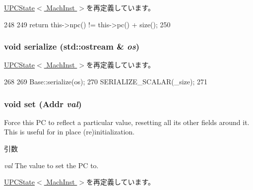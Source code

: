 \hyperlink{classGenericISA_1_1UPCState_ae3f0eb15a9382eefff6b00cf7999c2e3}{UPCState$<$ MachInst $>$}を再定義しています。


\begin{DoxyCode}
248         {
249             return this->npc() != this->pc() + size();
250         }
\end{DoxyCode}
\hypertarget{classX86ISA_1_1PCState_a53e036786d17361be4c7320d39c99b84}{
\subsubsection[{serialize}]{\setlength{\rightskip}{0pt plus 5cm}void serialize (std::ostream \& {\em os})}}
\label{classX86ISA_1_1PCState_a53e036786d17361be4c7320d39c99b84}


\hyperlink{classGenericISA_1_1UPCState_a53e036786d17361be4c7320d39c99b84}{UPCState$<$ MachInst $>$}を再定義しています。


\begin{DoxyCode}
268         {
269             Base::serialize(os);
270             SERIALIZE_SCALAR(_size);
271         }
\end{DoxyCode}
\hypertarget{classX86ISA_1_1PCState_a9a5b900e841dd75dc81970850547918f}{
\subsubsection[{set}]{\setlength{\rightskip}{0pt plus 5cm}void set ({\bf Addr} {\em val})}}
\label{classX86ISA_1_1PCState_a9a5b900e841dd75dc81970850547918f}
Force this PC to reflect a particular value, resetting all its other fields around it. This is useful for in place (re)initialization.


\begin{DoxyParams}{引数}
\item[{\em val}]The value to set the PC to. \end{DoxyParams}


\hyperlink{classGenericISA_1_1UPCState_a9a5b900e841dd75dc81970850547918f}{UPCState$<$ MachInst $>$}を再定義しています。


